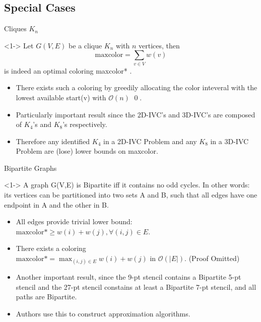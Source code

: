 \subsection{Special Cases}

\begin{frame}{Cliques $K_n$}
  \begin{theorem}<1->
    Let $G(V,E)$ be a clique $K_n$ with $n$ vertices, then  \[ \text{maxcolor}= \sum_{v \in V} w(v) \]
    is indeed an optimal coloring maxcolor* .
  \end{theorem}

  \begin{itemize}
    \item<2-> There exists such a coloring by greedily allocating the color inteveral with the lowest 
    available start(v) with $\mathcal{O}(n)$ \qed .

    \item<3-> Particularly important result since the 2D-IVC's and 3D-IVC's are composed of $K_4$'s and $K_8$'s
    respectively.

    \item<4-> Therefore any identified $K_4$ in a 2D-IVC Problem and any $K_8$ in a 3D-IVC Problem are 
    (lose) lower bounds on maxcolor.
  \end{itemize}
\end{frame}

\begin{frame}{Bipartite Graphs}
  \begin{Theorem}<1->
    A graph G(V,E) is Bipartite iff it contains no odd cycles. In other words: its vertices can be partitioned into
    two sets A and B, such that all edges have one endpoint in A and the other in B.
  \end{Theorem}

  \begin{itemize}
    \item<2-> All edges provide trivial lower bound: $ \text{maxcolor*} \ge  w(i) + w(j), \forall (i, j) \in E.$
    \item<3-> There exists a coloring \\ 
    $\text{maxcolor*} = \max_{(i,j) \in E} w(i) + w(j)$ in $\mathcal{O}(|E|)$. (Proof Omitted)
    \item<4-> Another important result, since the 9-pt stencil contains a Bipartite 5-pt stencil and the
    27-pt stencil constains at least a Bipartite 7-pt stencil, and all paths are Bipartite.
    \item<5-> Authors use this to construct approximation algorithms.
  \end{itemize}
\end{frame}

